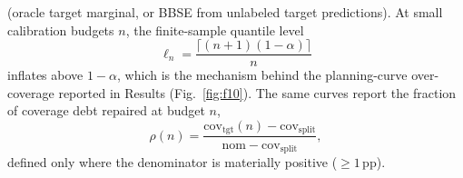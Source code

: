 \documentclass[preprint,11pt,authoryear]{elsarticle}
\begin{document}
(oracle target marginal, or BBSE from unlabeled target predictions).
At small calibration budgets
$n$, the finite-sample quantile level
\begin{equation}
\label{eq:fs-quantile}
\ell_n
=\frac{\lceil(n{+}1)(1{-}\alpha)\rceil}{n}
\end{equation}
inflates above $1{-}\alpha$, which is the mechanism behind the planning-curve over-coverage reported in
Results (Fig.~\ref{fig:f10}). The same curves report the fraction of coverage debt repaired at budget $n$,
\begin{equation}
\label{eq:debt-repaired}
\rho(n)
=\frac{\mathrm{cov}_{\mathrm{tgt}}(n)-\mathrm{cov}_{\mathrm{split}}}{\mathrm{nom}-\mathrm{cov}_{\mathrm{split}}},
\end{equation}
defined only where the denominator is materially positive (${\ge}1$\,pp).
\end{document}
